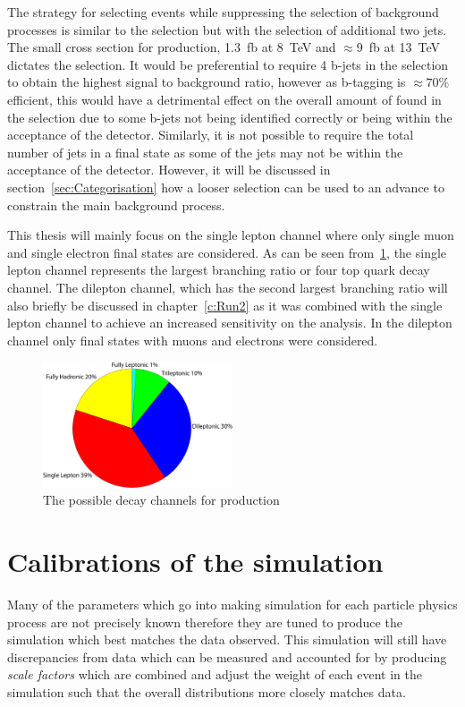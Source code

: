 The strategy for selecting \tttt events while suppressing the selection of background processes is similar to the \ttbar selection but with the selection of additional two jets. The small cross section for \tttt production, 1.3~fb at 8~TeV and $\approx$9~fb at 13~TeV dictates the selection. It would be preferential to require 4 b-jets in the selection to obtain the highest signal to background ratio, however as b-tagging is $\approx70\%$ efficient, this would have a detrimental effect on the overall amount of \tttt found in the selection due to some b-jets not being identified correctly or being within the acceptance of the detector. Similarly, it is not possible to require the total number of jets in a \tttt final state as some of the jets may not be within the acceptance of the detector. However, it will be discussed in section~\ref{sec:Categorisation} how a looser selection can be used to an advance to constrain the main background process.

This thesis will mainly focus on the single lepton channel where only single muon and single electron final states are considered. As can be seen from~\ref{fig:ttttDecay}, the single lepton channel represents the largest branching ratio or four top quark decay channel. The dilepton channel, which has the second largest branching ratio will also briefly be discussed in chapter~\ref{c:Run2} as it was combined with the single lepton channel to achieve an increased sensitivity on the analysis. In the dilepton channel only final states with muons and electrons were considered.

\begin{figure}[ht!]
\centering
    \includegraphics[width=0.5\textwidth]{images/Analysis/FourTopBR.pdf}
    \caption{The possible decay channels for \tttt production}
    \label{fig:ttttDecay}
\end{figure}




\section{Calibrations of the simulation}
\label{sec:Calibrations}
Many of the parameters which go into making simulation for each particle physics process are not precisely known therefore they are tuned to produce the simulation which best matches the data observed. This simulation will still have discrepancies from data which can be measured and accounted for by producing \emph{scale factors} which are combined and adjust the weight of each event in the simulation such that the overall distributions more closely matches data. 


